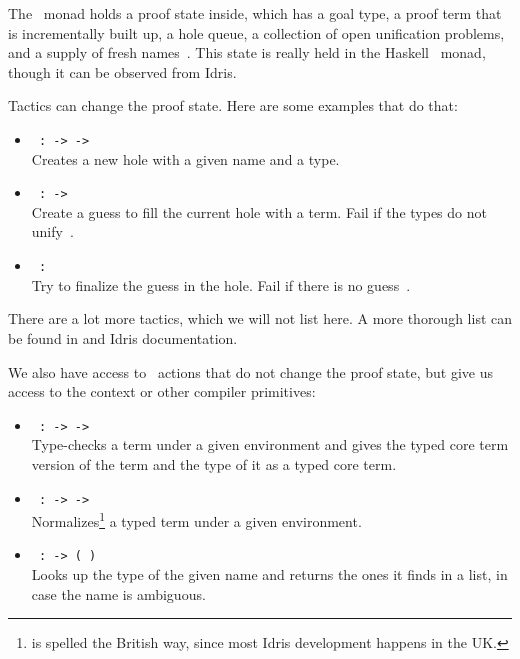 The \Elab\ monad holds a proof state inside, which has a goal type, a proof
term that is incrementally built up, a hole queue, a collection of open
unification problems, and a supply of fresh names~\cite{elabref}.
This state is really held in the Haskell \Elab\ monad, though it can be
observed from Idris.

Tactics can change the proof state. Here are some examples that do that:
\begin{itemize}
\item\texttt{ :  ->  ->  \IdrisType{()}}\\
  Creates a new hole with a given name and a type.
\item\texttt{ :  ->  \IdrisType{()}}\\
Create a guess to fill the current hole with a term. Fail if the types do not unify~\cite{mcbridephd}.
\item\texttt{ :  \IdrisType{()}}\\
Try to finalize the guess in the hole. Fail if there is no guess~\cite{mcbridephd}.
\end{itemize}

\noindent There are a lot more tactics, which we will not list here. A more thorough list
can be found in \citet{elabref} and Idris documentation.

We also have access to \Elab\ actions that do not change the proof state, but give us access to the context or other compiler primitives:
\begin{itemize}
\item\texttt{ :  \IdrisType{(}\IdrisType{,}  \IdrisType{)} ->  ->  \IdrisType{(}\IdrisType{,} \IdrisType{)}}\\
Type-checks a term under a given environment and gives the typed core term version of the  term and the type of it as a typed core term.
\item\texttt{ :  \IdrisType{(}\IdrisType{,}  \IdrisType{)} ->  ->  }\\
Normalizes\footnote{ is spelled the British way, since most Idris development happens in the UK.} a typed term under a given environment.
\item\texttt{ :  ->  ( \IdrisType{(}\IdrisType{,} \IdrisType{,} \IdrisType{)})}\\
Looks up the type of the given name and returns the ones it finds in a list, in case the name is ambiguous.
\end{itemize}

